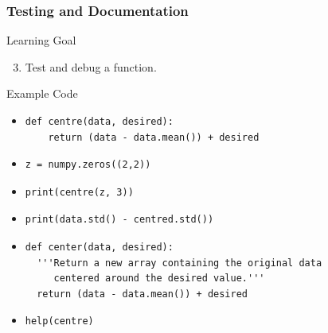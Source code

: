 \documentclass{beamer}
\begin{document}
\begin{frame}[fragile]
\frametitle{Testing and Documentation}
\begin{block}{Learning Goal}
\begin{enumerate}
\setcounter{enumi}{2}
\item    Test and debug a function.
\end{enumerate}
\end{block}
\begin{block}{Example Code}
\small{
\begin{itemize}
\item
\begin{verbatim}
def centre(data, desired):
    return (data - data.mean()) + desired
\end{verbatim}
\item
\begin{verbatim}
z = numpy.zeros((2,2))
\end{verbatim}
\item
\begin{verbatim}
print(centre(z, 3))
\end{verbatim}
\item
\begin{verbatim}
print(data.std() - centred.std())
\end{verbatim}
\item
\begin{verbatim}
def center(data, desired):
  '''Return a new array containing the original data
     centered around the desired value.'''
  return (data - data.mean()) + desired
\end{verbatim}
\item
\begin{verbatim}
help(centre)
\end{verbatim}
\end{itemize}}
\end{block}
\end{frame}
\end{document}
